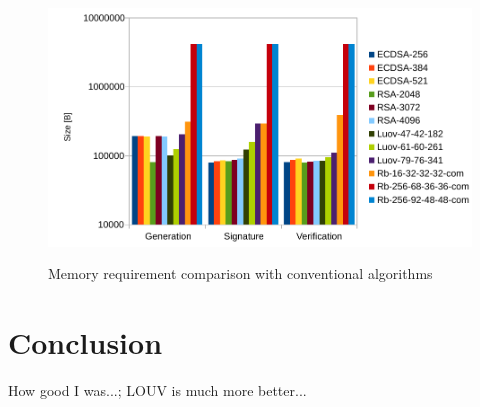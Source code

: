 \documentclass[thesis=M,english]{FITthesis}[2019/12/23]
\begin{document}
\begin{figure}[H]
\centering
\includegraphics[width=13cm,height=7cm]{images/mem-all.pdf}
\caption{Memory requirement comparison with conventional algorithms}
\label{mem-all}
\end{figure}

\chapter{Conclusion}
How good I was...; LOUV is much more better...



\end{document}
